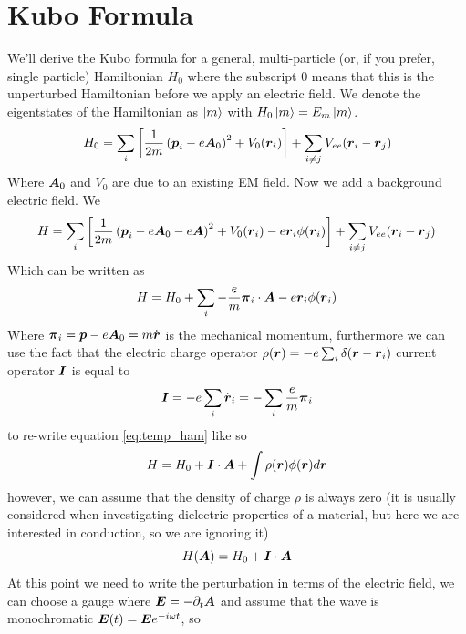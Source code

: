 \section{Kubo Formula}
We'll derive the Kubo formula for a general, multi-particle (or, if you prefer, single particle) Hamiltonian $H_0$ where the subscript 0 means that this is the unperturbed Hamiltonian before we apply an electric field. We denote the eigentstates of the Hamiltonian as $\ket m$ with $H_0\ket m=E_m \ket m$.
\begin{equation}
    H_0=\sum_i\left[\frac{1}{2m}\left(\boldsymbol{p}_i-e\boldsymbol{A}_0\right)^2 + V_0(\boldsymbol{r}_i)\right]+\sum_{i\neq j}V_{ee}(\boldsymbol{r}_i-\boldsymbol{r}_j)
\end{equation}
Where $\boldsymbol{A}_0$ and $V_0$ are due to an existing EM field. Now we add a background electric field. We 
\begin{equation}
    H=\sum_i\left[\frac{1}{2m}\left(\boldsymbol{p}_i-e\boldsymbol{A}_0 - e\boldsymbol{A}\right)^2 + V_0(\boldsymbol{r}_i) - e\boldsymbol{r}_i\phi(\boldsymbol{r}_i)\right]+\sum_{i\neq j}V_{ee}(\boldsymbol{r}_i-\boldsymbol{r}_j)
\end{equation}
Which can be written as 
\begin{equation}
    H=H_0 + \sum_{i}-\frac{e}m \boldsymbol \pi_i\cdot \boldsymbol{A} - e\boldsymbol{r}_i\phi(\boldsymbol{r}_i)
    \label{eq:temp_ham}
\end{equation}
Where $\boldsymbol \pi_i=\boldsymbol{p} -e\boldsymbol{A}_0=m\dot{\boldsymbol{r}}$ is the mechanical momentum,
furthermore we can use the fact that the electric charge operator $\rho(\boldsymbol{r})=-e\sum_{i}\delta(\boldsymbol{r}-\boldsymbol{r}_i)$ current operator  $\boldsymbol{I}$ is equal to 
\begin{equation}
    \boldsymbol{I}=-e\sum_{i}\dot{\boldsymbol{r}}_i=-\sum_{i}\frac{e}m \boldsymbol \pi_i
\end{equation}
to re-write equation \ref{eq:temp_ham} like so
\begin{equation}
    H=H_0+\boldsymbol{I}\cdot \boldsymbol{A} + \int\rho(\boldsymbol{r})\phi(\boldsymbol{r})d\boldsymbol{r}
\end{equation}
however, we can assume that the density of charge $\rho$ is always zero (it is usually considered when investigating dielectric properties of a material, but here we are interested in conduction, so we are ignoring it)
\begin{equation}
    H(\boldsymbol{A})=H_0+\boldsymbol{I}\cdot \boldsymbol{A}
    \label{eq:deltaH}
\end{equation}
At this point we need to write the perturbation in terms of the electric field, we can choose a gauge where $\boldsymbol{E}=-\partial_t\boldsymbol{A}$ and assume that the wave is monochromatic $\boldsymbol{E}(t)=\boldsymbol{E}e^{-i\omega t}$, so 

